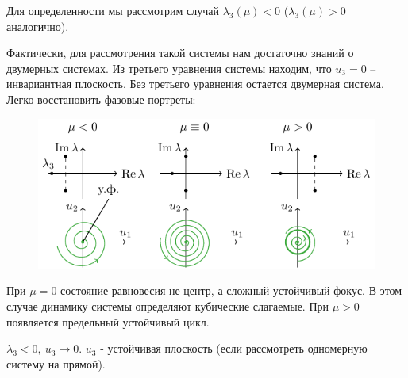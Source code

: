  Для определенности мы рассмотрим случай $\lambda_3(\mu)<0$ ($\lambda_3(\mu)>0$ аналогично).

 Фактически, для рассмотрения такой системы нам достаточно знаний о двумерных системах. Из третьего уравнения системы находим, что $u_3=0$ -- инвариантная плоскость. Без третьего уравнения остается двумерная система. Легко восстановить фазовые портреты:
 \begin{figure}[H]
	\centering
	\includegraphics[scale=1.5]{img/multidimensional_dynamic_systems/kor1_1} 
\end{figure}

При $\mu=0$ состояние равновесия не центр, а сложный устойчивый фокус. В этом случае динамику системы определяют кубические слагаемые. При $\mu>0$ появляется предельный устойчивый цикл. 

$\lambda_3<0,~u_3 \rightarrow 0$. $u_3$ - устойчивая плоскость (если рассмотреть одномерную систему на прямой).

